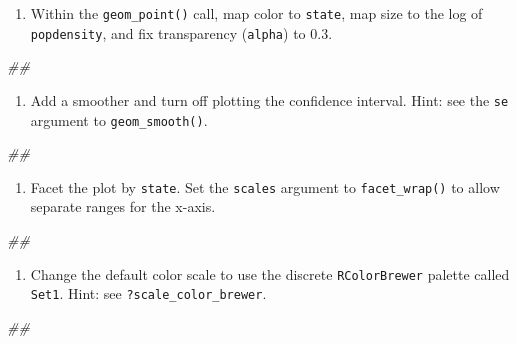 \documentclass[
]{book}
\newenvironment{Shaded}{\begin{snugshade}}{\end{snugshade}}
\newcommand{\CommentTok}[1]{\textcolor[rgb]{0.56,0.35,0.01}{\textit{#1}}}
\providecommand{\tightlist}{%
  \setlength{\itemsep}{0pt}\setlength{\parskip}{0pt}}
\begin{document}
\begin{enumerate}
\def\labelenumi{\arabic{enumi}.}
\setcounter{enumi}{1}
\tightlist
\item
  Within the \texttt{geom\_point()} call, map color to \texttt{state}, map size to the log of \texttt{popdensity}, and fix transparency (\texttt{alpha}) to 0.3.
\end{enumerate}

\begin{Shaded}
\begin{Highlighting}[]
\CommentTok{\#\# }
\end{Highlighting}
\end{Shaded}

\begin{enumerate}
\def\labelenumi{\arabic{enumi}.}
\setcounter{enumi}{2}
\tightlist
\item
  Add a smoother and turn off plotting the confidence interval. Hint: see the \texttt{se} argument to \texttt{geom\_smooth()}.
\end{enumerate}

\begin{Shaded}
\begin{Highlighting}[]
\CommentTok{\#\# }
\end{Highlighting}
\end{Shaded}

\begin{enumerate}
\def\labelenumi{\arabic{enumi}.}
\setcounter{enumi}{3}
\tightlist
\item
  Facet the plot by \texttt{state}. Set the \texttt{scales} argument to \texttt{facet\_wrap()} to allow separate ranges for the x-axis.
\end{enumerate}

\begin{Shaded}
\begin{Highlighting}[]
\CommentTok{\#\# }
\end{Highlighting}
\end{Shaded}

\begin{enumerate}
\def\labelenumi{\arabic{enumi}.}
\setcounter{enumi}{4}
\tightlist
\item
  Change the default color scale to use the discrete \texttt{RColorBrewer} palette called \texttt{Set1}. Hint: see \texttt{?scale\_color\_brewer}.
\end{enumerate}

\begin{Shaded}
\begin{Highlighting}[]
\CommentTok{\#\# }
\end{Highlighting}
\end{Shaded}
\end{document}
